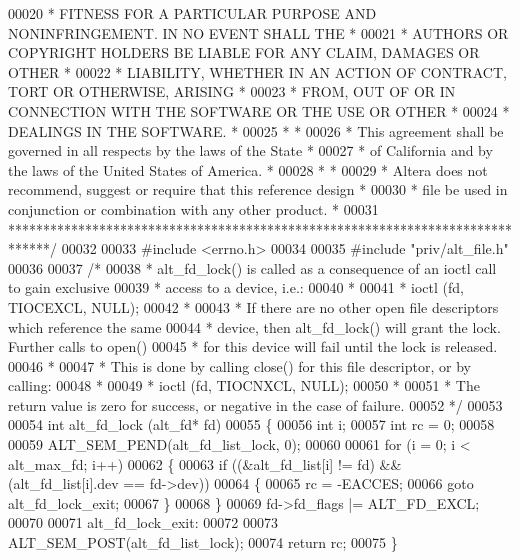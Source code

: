 \begin{DoxyCode}
00020 \textcolor{comment}{* FITNESS FOR A PARTICULAR PURPOSE AND NONINFRINGEMENT. IN NO EVENT SHALL THE *}
00021 \textcolor{comment}{* AUTHORS OR COPYRIGHT HOLDERS BE LIABLE FOR ANY CLAIM, DAMAGES OR OTHER      *}
00022 \textcolor{comment}{* LIABILITY, WHETHER IN AN ACTION OF CONTRACT, TORT OR OTHERWISE, ARISING     *}
00023 \textcolor{comment}{* FROM, OUT OF OR IN CONNECTION WITH THE SOFTWARE OR THE USE OR OTHER         *}
00024 \textcolor{comment}{* DEALINGS IN THE SOFTWARE.                                                   *}
00025 \textcolor{comment}{*                                                                             *}
00026 \textcolor{comment}{* This agreement shall be governed in all respects by the laws of the State   *}
00027 \textcolor{comment}{* of California and by the laws of the United States of America.              *}
00028 \textcolor{comment}{*                                                                             *}
00029 \textcolor{comment}{* Altera does not recommend, suggest or require that this reference design    *}
00030 \textcolor{comment}{* file be used in conjunction or combination with any other product.          *}
00031 \textcolor{comment}{******************************************************************************/}
00032 
00033 \textcolor{preprocessor}{#include <errno.h>}
00034 
00035 \textcolor{preprocessor}{#include "priv/alt_file.h"}
00036 
00037 \textcolor{comment}{/*}
00038 \textcolor{comment}{ * alt\_fd\_lock() is called as a consequence of an ioctl call to gain exclusive}
00039 \textcolor{comment}{ * access to a device, i.e.:}
00040 \textcolor{comment}{ *}
00041 \textcolor{comment}{ * ioctl (fd, TIOCEXCL, NULL);}
00042 \textcolor{comment}{ *}
00043 \textcolor{comment}{ * If there are no other open file descriptors which reference the same}
00044 \textcolor{comment}{ * device, then alt\_fd\_lock() will grant the lock. Further calls to open() }
00045 \textcolor{comment}{ * for this device will fail until the lock is released.}
00046 \textcolor{comment}{ *}
00047 \textcolor{comment}{ * This is done by calling close() for this file descriptor, or by calling:}
00048 \textcolor{comment}{ *}
00049 \textcolor{comment}{ * ioctl (fd, TIOCNXCL, NULL);}
00050 \textcolor{comment}{ *}
00051 \textcolor{comment}{ * The return value is zero for success, or negative in the case of failure.}
00052 \textcolor{comment}{ */}
00053 
00054 \textcolor{keywordtype}{int} alt_fd_lock (alt_fd* fd)
00055 \{
00056   \textcolor{keywordtype}{int} i;
00057   \textcolor{keywordtype}{int} rc = 0;
00058 
00059   ALT_SEM_PEND(alt\_fd\_list\_lock, 0);
00060 
00061   \textcolor{keywordflow}{for} (i = 0; i < alt_max_fd; i++)
00062   \{
00063     \textcolor{keywordflow}{if} ((&alt_fd_list[i] != fd) && (alt_fd_list[i].dev == fd->dev))
00064     \{
00065       rc = -EACCES;
00066       \textcolor{keywordflow}{goto} alt\_fd\_lock\_exit;
00067     \}
00068   \}
00069   fd->fd_flags |= ALT_FD_EXCL;
00070 
00071  alt\_fd\_lock\_exit:
00072 
00073   ALT_SEM_POST(alt\_fd\_list\_lock);
00074   \textcolor{keywordflow}{return} rc;
00075 \}
\end{DoxyCode}
